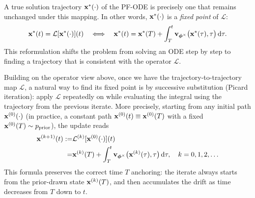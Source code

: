 A true solution trajectory ${\mathbf{x}}^*(\cdot)$ of the PF-ODE is precisely one that remains unchanged under this mapping. 
In other words, ${\mathbf{x}}^*(\cdot)$ is a \emph{fixed point} of $\mathcal{L}$:
\[
{\mathbf{x}}^*(t) = \mathcal{L}[{\mathbf{x}}^*(\cdot)](t)
\quad\Longleftrightarrow\quad
{\mathbf{x}}^*(t)
= {\mathbf{x}}^*(T) + \int_{T}^{t}{\mathbf{v}}_{{\bm{\phi}}^\times} \big({\mathbf{x}}^*(\tau),\tau\big) \mathop{}\!\mathrm{d}\tau.
\]
This reformulation shifts the problem from solving an ODE step by step to finding a trajectory that is consistent with the operator $\mathcal{L}$. 


Building on the operator view above, once we have the trajectory-to-trajectory map
$\mathcal{L}$, a natural way to find its fixed point is by successive
substitution (Picard iteration): apply $\mathcal{L}$ repeatedly on  while  evaluating the integral using the trajectory from the previous iterate. 
More precisely, starting from any
initial path ${\mathbf{x}}^{(0)}(\cdot)$ (in practice, a constant path
${\mathbf{x}}^{(0)}(t)\equiv {\mathbf{x}}^{(0)}(T)$ with a fixed ${\mathbf{x}}^{(0)}(T)\sim p_{\mathrm{prior}}$), the update reads
\begin{align}\label{eq:picard_iter_T_to_t}
    \begin{aligned}
    {\mathbf{x}}^{(k+1)}(t)
    := &\mathcal{L}^{(k)}[{\mathbf{x}}^{(0)}(\cdot)](t)
    \\=
    &{\mathbf{x}}^{(k)}(T)
    +\int_{T}^{t}
    {\mathbf{v}}_{{\bm{\phi}}^\times} \big({\mathbf{x}}^{(k)}(\tau),\tau\big)\mathop{}\!\mathrm{d}\tau,
    \quad k=0,1,2,\ldots
    \end{aligned}
\end{align}
This formula preserves the correct time $T$ anchoring: the iterate always starts
from the prior-drawn state ${\mathbf{x}}^{(k)}(T)$, and then accumulates the
drift as time decreases from $T$ down to $t$.

